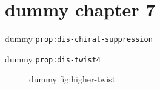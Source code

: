 \clearpage\begingroup\small
\setcounter{chapter}{7}\addtocounter{chapter}{-1}
\chapter{dummy chapter 7}
\begin{proposition}\label{prop:dis-chiral-suppression}dummy \texttt{prop:dis-chiral-suppression}\end{proposition}
\begin{proposition}\label{prop:dis-twist4}dummy \texttt{prop:dis-twist4}\end{proposition}
\begin{figure}[h]\centering{}\caption{dummy fig:higher-twist}\label{fig:higher-twist}\end{figure}
\endgroup
